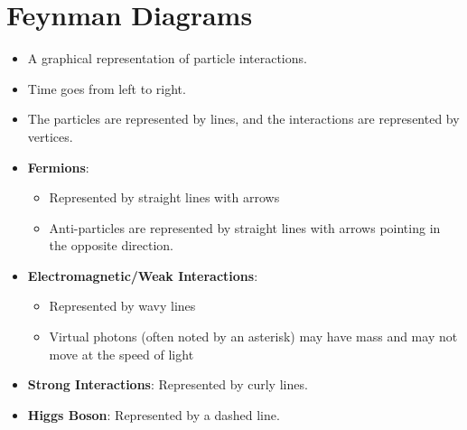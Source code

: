 \section{Feynman Diagrams}
\begin{itemize}
    \item A graphical representation of particle interactions.
    \item Time goes from left to right.
    \item The particles are represented by lines, and the interactions are represented by vertices.
    \item \textbf{Fermions}: 
    \begin{itemize}
        \item Represented by straight lines with arrows
        \item Anti-particles are represented by straight lines with arrows pointing in the opposite direction.
    \end{itemize}
    \item \textbf{Electromagnetic/Weak Interactions}:
    \begin{itemize}
        \item Represented by wavy lines
        \item Virtual photons (often noted by an asterisk) may have mass and may not move at the speed of light
    \end{itemize}
    \item \textbf{Strong Interactions}: Represented by curly lines.
    \item \textbf{Higgs Boson}: Represented by a dashed line.
\end{itemize}

